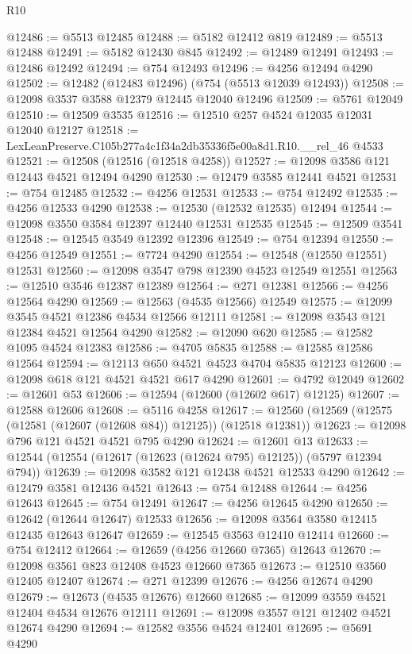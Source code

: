 \begin{lexlean}{R10}
\begin{coremodule}
@12486 := @5513 @12485
@12488 := @5182 @12412 @819
@12489 := @5513 @12488
@12491 := @5182 @12430 @845
@12492 := @12489 @12491
@12493 := @12486 @12492
@12494 := @754 @12493
@12496 := @4256 @12494 @4290
@12502 := @12482 (@12483 @12496) (@754 (@5513 @12039 @12493))
@12508 := @12098 @3537 @3588 @12379 @12445 @12040 @12496
@12509 := @5761 @12049
@12510 := @12509 @3535
@12516 := @12510 @257 @4524 @12035 @12031 @12040 @12127
@12518 := LexLeanPreserve.C105b277a4c1f34a2db35336f5e00a8d1.R10.__rel_46 @4533
@12521 := @12508 (@12516 (@12518 @4258))
@12527 := @12098 @3586 @121 @12443 @4521 @12494 @4290
@12530 := @12479 @3585 @12441 @4521
@12531 := @754 @12485
@12532 := @4256 @12531
@12533 := @754 @12492
@12535 := @4256 @12533 @4290
@12538 := @12530 (@12532 @12535) @12494
@12544 := @12098 @3550 @3584 @12397 @12440 @12531 @12535
@12545 := @12509 @3541
@12548 := @12545 @3549 @12392 @12396
@12549 := @754 @12394
@12550 := @4256 @12549
@12551 := @7724 @4290
@12554 := @12548 (@12550 @12551) @12531
@12560 := @12098 @3547 @798 @12390 @4523 @12549 @12551
@12563 := @12510 @3546 @12387 @12389
@12564 := @271 @12381
@12566 := @4256 @12564 @4290
@12569 := @12563 (@4535 @12566) @12549
@12575 := @12099 @3545 @4521 @12386 @4534 @12566 @12111
@12581 := @12098 @3543 @121 @12384 @4521 @12564 @4290
@12582 := @12090 @620
@12585 := @12582 @1095 @4524 @12383
@12586 := @4705 @5835
@12588 := @12585 @12586 @12564
@12594 := @12113 @650 @4521 @4523 @4704 @5835 @12123
@12600 := @12098 @618 @121 @4521 @4521 @617 @4290
@12601 := @4792 @12049
@12602 := @12601 @53
@12606 := @12594 (@12600 (@12602 @617) @12125)
@12607 := @12588 @12606
@12608 := @5116 @4258
@12617 := @12560 (@12569 (@12575 (@12581 (@12607 (@12608 @84)) @12125)) (@12518 @12381))
@12623 := @12098 @796 @121 @4521 @4521 @795 @4290
@12624 := @12601 @13
@12633 := @12544 (@12554 (@12617 (@12623 (@12624 @795) @12125)) (@5797 @12394 @794))
@12639 := @12098 @3582 @121 @12438 @4521 @12533 @4290
@12642 := @12479 @3581 @12436 @4521
@12643 := @754 @12488
@12644 := @4256 @12643
@12645 := @754 @12491
@12647 := @4256 @12645 @4290
@12650 := @12642 (@12644 @12647) @12533
@12656 := @12098 @3564 @3580 @12415 @12435 @12643 @12647
@12659 := @12545 @3563 @12410 @12414
@12660 := @754 @12412
@12664 := @12659 (@4256 @12660 @7365) @12643
@12670 := @12098 @3561 @823 @12408 @4523 @12660 @7365
@12673 := @12510 @3560 @12405 @12407
@12674 := @271 @12399
@12676 := @4256 @12674 @4290
@12679 := @12673 (@4535 @12676) @12660
@12685 := @12099 @3559 @4521 @12404 @4534 @12676 @12111
@12691 := @12098 @3557 @121 @12402 @4521 @12674 @4290
@12694 := @12582 @3556 @4524 @12401
@12695 := @5691 @4290

\end{coremodule}
\end{lexlean}
